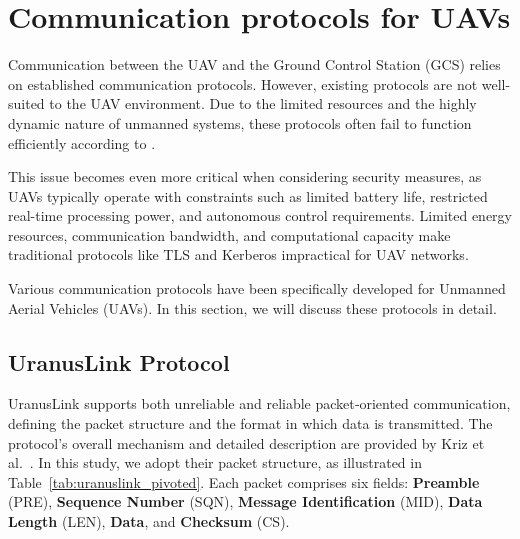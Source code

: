 

\section{Communication protocols for UAVs}

Communication between the UAV and the Ground Control Station (GCS) relies on established communication protocols. However, existing protocols are not well-suited to the UAV environment. Due to the limited resources and the highly dynamic nature of unmanned systems, these protocols often fail to function efficiently according to \cite{larrieu2014model}.

\vspace{0.5cm}

This issue becomes even more critical when considering security measures, as UAVs typically operate with constraints such as limited battery life, restricted real-time processing power, and autonomous control requirements. Limited energy resources, communication bandwidth, and computational capacity make traditional protocols like TLS and Kerberos impractical for UAV networks.

\vspace{0.5cm}

Various communication protocols have been specifically developed for Unmanned Aerial Vehicles (UAVs). In this section, we will discuss these protocols in detail.


\subsection{UranusLink Protocol}


 UranusLink supports both unreliable and reliable packet‑oriented communication, defining the packet structure and the format in which data is transmitted. The protocol’s overall mechanism and detailed description are provided by Kriz et al.~\cite{kriz2015uranuslink}. In this study, we adopt their packet structure, as illustrated in Table~\ref{tab:uranuslink_pivoted}. Each packet comprises six fields: \textbf{Preamble} (PRE), \textbf{Sequence Number} (SQN), \textbf{Message Identification} (MID), \textbf{Data Length} (LEN), \textbf{Data}, and \textbf{Checksum} (CS).



